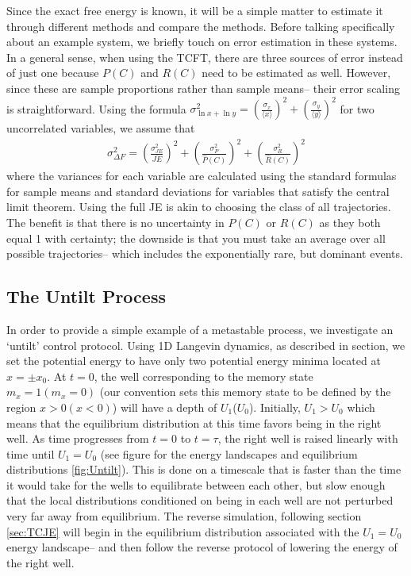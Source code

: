 \documentclass[paper=a4, fontsize=10pt]{article} %
\numberwithin{equation}{section} %
\numberwithin{figure}{section} %
\numberwithin{table}{section} %
\def\avg#1{\langle #1 \rangle}
\begin{document}
Since the exact free energy is known, it will be a simple matter to estimate it through different methods and compare the methods.
Before talking specifically about an example system, we briefly touch on error estimation in these systems.  In a general sense, when using the TCFT, there are three sources of error instead of just one because $P(C)$ and $R(C)$ need to be estimated as well. However, since these are sample proportions rather than sample means-- their error scaling is straightforward. Using the formula $\sigma^2_{\ln x+\ln y} = \left(\frac{\sigma_x}{\avg{x}}\right)^2 + \left(\frac{\sigma_y}{\avg{y}}\right)^2$ for two uncorrelated variables, we assume that
\begin{align} \label{ref:VarianceCalc}
\sigma^2_{\Delta F} =\left(\frac{\sigma^2_{JE}}{\bar{JE}}\right)^2 + \left(\frac{\sigma^2_P}{\hat{P}(C)}\right)^2 + \left(\frac{\sigma^2_R}{\hat{R}(C)}\right)^2
\end{align}
where the variances for each variable are calculated using the standard formulas for sample means and standard deviations for variables that satisfy the central limit theorem. Using the full JE is akin to choosing the class of all trajectories. The benefit is that there is no uncertainty in $P(C)$ or $R(C)$ as they both equal 1 with certainty; the downside is that you must take an average over all possible trajectories-- which includes the exponentially rare, but dominant events.

\subsection{The Untilt Process}
In order to provide a simple example of a metastable process, we investigate an `untilt' control protocol. Using 1D Langevin dynamics, as described in section, we set the potential energy to have only two potential energy minima located at $x = \pm x_0$. At $t=0$, the well corresponding to the memory state $m_x=1(m_x=0)$ (our convention sets this memory state to be defined by the region $x>0(x<0)$) will have a depth of $U_1$($U_0$). Initially, $U_1 > U_0$ which means that the equilibrium distribution at this time favors being in the right well.  As time progresses from $t=0$ to $t=\tau$, the right well is raised linearly with time until $U_1=U_0$ (see figure for the energy landscapes and equilibrium distributions \ref{fig:Untilt}). This is done on a timescale that is faster than the time it would take for the wells to equilibrate between each other, but slow enough that the local distributions conditioned on being in each well are not perturbed very far away from equilibrium. The reverse simulation, following section \ref{sec:TCJE} will begin in the equilibrium distribution associated with the $U_1=U_0$ energy landscape-- and then follow the reverse protocol of lowering the energy of the right well.
\end{document}
